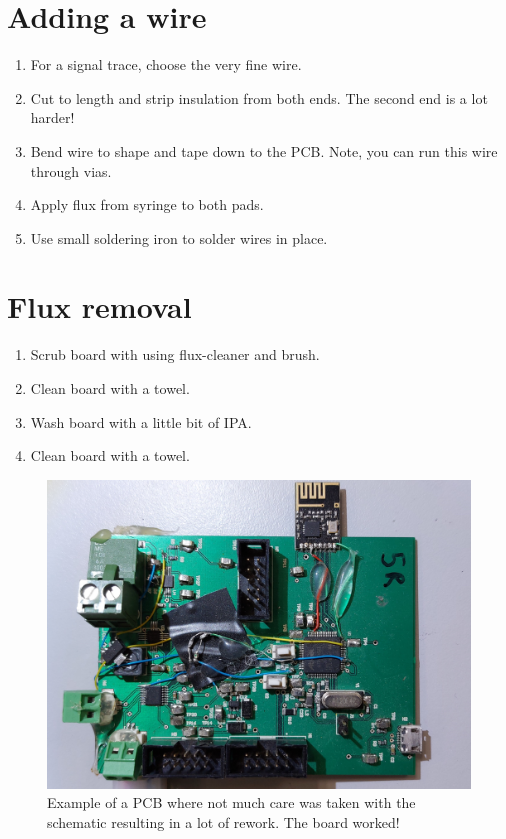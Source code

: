 \section{Adding a wire}

\begin{enumerate}
\item For a signal trace, choose the very fine wire.

\item Cut to length and strip insulation from both ends.  The second
  end is a lot harder!

\item Bend wire to shape and tape down to the PCB.  Note, you can run
  this wire through vias.

\item Apply flux from syringe to both pads.

\item Use small soldering iron to solder wires in place.
\end{enumerate}


\section{Flux removal}
\label{flux removal}

\begin{enumerate}
\item Scrub board with using flux-cleaner and brush.

\item Clean board with a towel.

\item Wash board with a little bit of IPA.

\item Clean board with a towel.
\end{enumerate}




\begin{figure}[!h]
  \centering \includegraphics[width=6in]{figs/rework2.jpg}
  \caption{Example of a PCB where not much care was taken with the
    schematic resulting in a lot of rework. The board worked!}
  \label{fig:rework2}
\end{figure}
